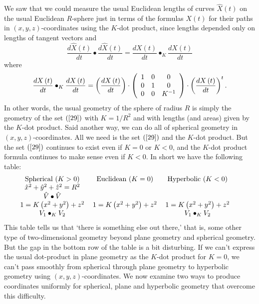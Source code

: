 \documentclass{article}%
\begin{document}
We saw that we could measure the usual Euclidean lengths of curves $\hat
{X}\left(  t\right)  $ on the usual Euclidean $R$-sphere just in terms of the
formulas $X\left(  t\right)  $ for their paths in $\left(  x,y,z\right)
$-coordinates using the $K$-dot product, since lengths depended only on
lengths of tangent vectors and%
\[
\frac{d\hat{X}\left(  t\right)  }{dt}\bullet\frac{d\hat{X}\left(  t\right)
}{dt}=\frac{dX\left(  t\right)  }{dt}\bullet_{K}\frac{dX\left(  t\right)
}{dt}%
\]
where%
\[
\frac{dX\left(  t\right)  }{dt}\bullet_{K}\frac{dX\left(  t\right)  }%
{dt}=\left(  \frac{dX\left(  t\right)  }{dt}\right)  \cdot\left(
\begin{array}
[c]{ccc}%
1 & 0 & 0\\
0 & 1 & 0\\
0 & 0 & K^{-1}%
\end{array}
\right)  \cdot\left(  \frac{dX\left(  t\right)  }{dt}\right)  ^{t}.
\]
In other words, the usual geometry of the sphere of radius $R$ is simply the
geometry of the set $\left(  \ref{29}\right)  $ with $K=1/R^{2}$ and with
lengths (and areas) given by the $K$-dot product. Said another way, we can do
all of spherical geometry in $\left(  x,y,z\right)  $-coordinates. All we need
is the set $\left(  \ref{29}\right)  $ and the $K$-dot product. But the set
$\left(  \ref{29}\right)  $ continues to exist even if $K=0$ or $K<0$, and the
$K$-dot product formula continues to make sense even if $K<0$. In short we
have the following table:
\begin{equation}%
\begin{tabular}
[c]{ccc}%
Spherical ($K>0$) & Euclidean ($K=0$) & Hyperbolic ($K<0$)\\
$\hat{x}^{2}+\hat{y}^{2}+\hat{z}^{2}=R^{2}$ &  & \\
$\hat{V}\bullet\hat{V}$ &  & \\
$1=K\left(  x^{2}+y^{2}\right)  +z^{2}$ & $1=K\left(  x^{2}+y^{2}\right)
+z^{2}$ & $1=K\left(  x^{2}+y^{2}\right)  +z^{2}$\\
$V_{1}\bullet_{K}V_{2}$ &  & $V_{1}\bullet_{K}V_{2}$%
\end{tabular}
\ \ \ \ \label{66}%
\end{equation}
This table tells us that `there is something else out there,' that is, some
other type of two-dimensional geometry beyond plane geometry and spherical
geometry. But the gap in the bottom row of the table is a bit disturbing. If
we can't express the usual dot-product in plane geometry as the $K$-dot
product for $K=0$, we can't pass smoothly from spherical through plane
geometry to hyperbolic geometry using $\left(  x,y,z\right)  $-coordinates. We
now examine two ways to produce coordinates uniformly for spherical, plane and
hyperbolic geometry that overcome this difficulty.
\end{document}
